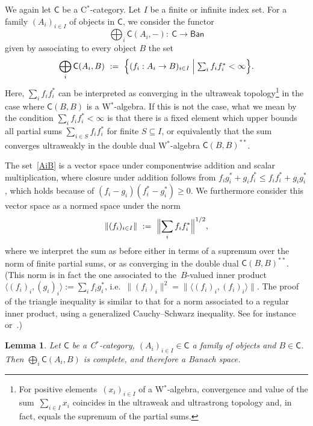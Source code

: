 \documentclass[reqno,T1,11pt]{amsproc}
\newcommand{\beq}{\begin{equation}}
\newcommand{\eeq}{\end{equation}}
\newcommand{\cat}[1]{\mathsf{#1}}		%
\newcommand{\Ban}{\mathsf{Ban}}			%
\theoremstyle{plain}
\newtheorem{lem}[thm]{Lemma}
\theoremstyle{remark}
\numberwithin{equation}{section}
\begin{document}
We again let $\cat{C}$ be a C$^*$-category. Let $I$ be a finite or infinite index set. For a family $(A_i)_{i\in I}$ of objects in $\cat{C}$, we consider the functor
\[
	\bigoplus_i \cat{C}(A_i,-) \colon \  \cat{C} \to \Ban
\]
given by associating to every object $B$ the set
\beq
\label{AiB}
	\bigoplus_i \cat{C}(A_i , B) \ := \ \Bigl\{ (f_i : A_i \to B)_{i\in I} \Bigm\vert\textstyle  \sum_i f_i f_i^* < \infty \Bigr\}.
\eeq
Here, $\sum_i f_i f_i^*$ can be interpreted as converging in the ultraweak topology\footnote{For positive elements~$(x_i)_{i \in I}$ of a W$^*$-algebra, convergence and value of the sum~$\sum_{i \in I} x_i$ coincides in the ultraweak and ultrastrong topology and, in fact, equals the supremum of the partial sums.} in the case where $\cat{C}(B,B)$ is a W$^*$-algebra. If this is not the case, what we mean by the condition $\sum_i f_i f_i^* < \infty$ is that there is a fixed element which upper bounds all partial sums $\sum_{i\in S} f_i f_i^*$ for finite $S\subseteq I$, or equivalently that the sum converges ultraweakly in the double dual W$^*$-algebra $\cat{C}(B,B)^{**}$.

The set~\eqref{AiB} is a vector space under componentwise addition and scalar multiplication, where closure under addition follows from $f_i g^*_i + g_i f^*_i \leq f_i f^*_i + g_i g^*_i$, which holds because of $(f_i - g_i) (f^*_i - g^*_i) \geq 0$. We furthermore consider this vector space as a normed space under the norm
\[
	\| (f_i)_{i \in I} \| \ :=\  \Bigl\| \sum_i f_i f_i^* \Bigr\|^{1/2},
\]
where we interpret the sum as before either in terms of a supremum over the norm of finite partial sums, or as converging in the double dual $\cat{C}(B,B)^{**}$.
(This norm is in fact the one associated to the~$B$-valued inner
        product~$\langle (f_i)_i, (g_i)_i \rangle  :=
                \sum_i f_ig_i^*$,
                i.e.~$\| (f_i)_i \|^2 = \|\langle (f_i)_i, (f_i)_i \rangle\|$.
        The proof of the triangle inequality
                is similar to that for a
            norm associated to a regular inner product,
            using a generalized Cauchy--Schwarz inequality.
            See for instance~\cite[\S142\textsubscript{III--V}]{bas}
                or~\cite[Prop.~2.3]{paschke}.)

\begin{lem}
	Let $\cat{C}$ be a C$^*$-category, $(A_i)_{i\in I}\in\cat{C}$ a family of objects and $B\in\cat{C}$. Then $\bigoplus_i \cat{C}(A_i,B)$ is complete, and therefore a Banach space.
\label{lem_complete}
\end{lem}
\end{document}
